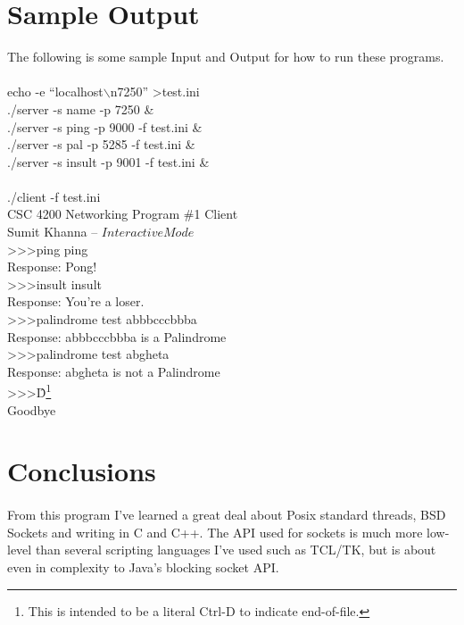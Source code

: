 \documentclass[a4paper,11pt]{article}
\begin{document}
\section{Sample Output}
The following is some sample Input and Output for how to run these programs.\\
\\
echo -e ``localhost$\backslash$n7250'' \textgreater test.ini\\
./server -s name -p 7250 \&\\
./server -s ping -p 9000 -f test.ini \&\\
./server -s pal -p 5285 -f test.ini \&\\
./server -s insult -p 9001 -f test.ini \&\\
\\
./client -f test.ini\\
CSC 4200 Networking Program \#1 Client\\
 Sumit Khanna -- \(Interactive Mode\)\\
\textgreater\textgreater\textgreater ping ping\\
Response: Pong!\\
\textgreater\textgreater\textgreater insult insult\\
Response: You're a loser.\\
\textgreater\textgreater\textgreater palindrome test abbbcccbbba\\
Response: abbbcccbbba is a Palindrome\\
\textgreater\textgreater\textgreater palindrome test abgheta\\
Response: abgheta is not a Palindrome\\
\textgreater\textgreater\textgreater \^D\footnote{This is intended to be a literal Ctrl-D to indicate end-of-file.}\\
Goodbye\\

\section{Conclusions}
\paragraph{}From this program I've learned a great deal about Posix standard threads, BSD Sockets and writing in C and C++. The API used for sockets is much more low-level than several scripting languages I've used such as TCL/TK, but is about even in complexity to Java's blocking socket API.
\end{document}
